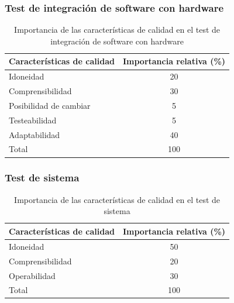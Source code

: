 \documentclass[
11pt, %
codirector, %
]{simple_charter}
\begin{document}
\subsubsection{Test de integración de software con hardware}
\label{sssec:test-de-integracion-de-software-con-hardware}

\begin{table}[H]
\centering
\begin{tabular}{@{}lc@{}}
\toprule
\textbf{Características de calidad} & \textbf{Importancia relativa (\%)} \\ \midrule
Idoneidad                           & 20                                 \\
Comprensibilidad                    & 30                                 \\
Posibilidad de cambiar              & 5                                  \\
Testeabilidad                       & 5                                  \\
Adaptabilidad                       & 40                                 \\
Total                               & 100                                \\ \bottomrule
\end{tabular}
\caption{Importancia de las características de calidad en el test de integración de software con
hardware}
\label{tab:ir-int-soft-hard}
\end{table}

\subsubsection{Test de sistema}
\label{sssec:test-de-sistema}

\begin{table}[H]
\centering
\begin{tabular}{@{}lc@{}}
\toprule
\textbf{Características de calidad} & \textbf{Importancia relativa (\%)} \\ \midrule
Idoneidad                           & 50                                 \\
Comprensibilidad                    & 20                                 \\
Operabilidad                        & 30                                 \\
Total                               & 100                                \\ \bottomrule
\end{tabular}
\caption{Importancia de las características de calidad en el test de sistema}
\label{tab:ir-test-sys}
\end{table}
\end{document}
